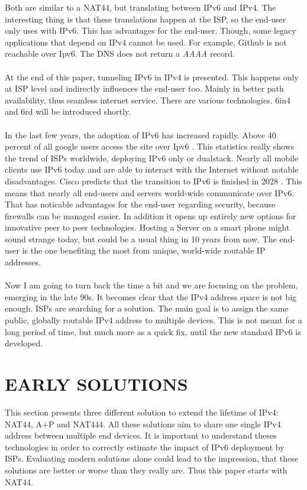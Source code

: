 \documentclass[format=sigconf, natbib=true, nonacm=true]{acmart}
\begin{document}
Both are similar to a NAT44, but translating between IPv6 and IPv4. The interesting thing is that these translations happen at the ISP, so the end-user only uses with IPv6. This has advantages for the end-user. Though, some legacy applications that depend on IPv4 cannot be used. For example, Github is not reachable over Ipv6. The DNS does not return a \textit{AAAA} record.\\\\At the end of this paper, tunneling IPv6 in IPv4 is presented. This happens only at ISP level and indirectly influences the end-user too. Mainly in better path availability, thus seamless internet service. There are various technologies. 6in4 and 6rd will be introduced shortly.\\\\In the last few years, the adoption of IPv6 has increased rapidly. Above 40 percent of all google users access the site over Ipv6 \cite{GoogleIPv6}. This statistics really shows the trend of ISPs worldwide, deploying IPv6 only or dualstack. Nearly all mobile clients use IPv6 today and are able to interact with the Internet without notable disadvantages. Cisco predicts that the transition to IPv6 is finished in 2028 \cite{Hughes2022_C05}. This means that nearly all end-users and servers world-wide communicate over IPv6. That has noticable advantages for the end-user regarding security, because firewalls can be managed easier. In addition it opens up entirely new options for innovative peer to peer technologies. Hosting a Server on a smart phone might sound strange today, but could be a usual thing in 10 years from now. The end-user is the one benefiting the most from unique, world-wide routable IP addresses.\\\\Now I am going to turn back the time a bit and we are focusing on the problem, emerging in the late 90s. It becomes clear that the IPv4 address space is not big enough. ISPs are searching for a solution. The main goal is to assign the same public, globally routable IPv4 address to multiple devices. This is not meant for a long period of time, but much more as a quick fix, until the new standard IPv6 is developed.
    
    \section{EARLY SOLUTIONS}
    This section presents three different solution to extend the lifetime of IPv4: NAT44, A+P and NAT444. All these solutions aim to share one single IPv4 address between multiple end devices. It is important to understand theses technologies in order to correctly estimate the impact of IPv6 deployment by ISPs. Evaluating modern solutions alone could lead to the impression, that these solutions are better or worse than they really are. Thus this paper starts with NAT44.
\end{document}

